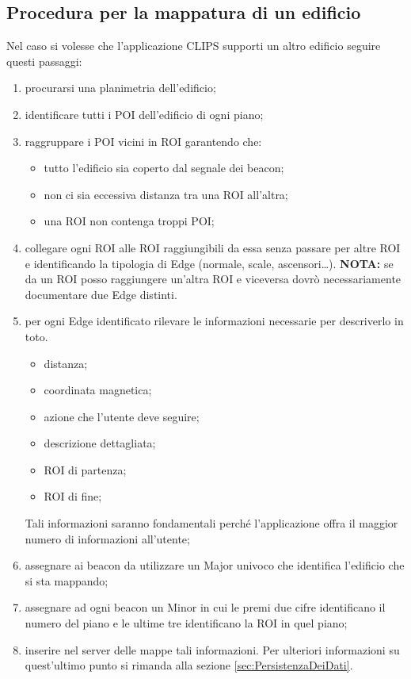 \documentclass[../ManualeSviluppatore.tex]{subfiles}
\begin{document}
	\subsection{Procedura per la mappatura di un edificio}
		Nel caso si volesse che l'applicazione CLIPS supporti un altro edificio seguire questi passaggi:
		\begin{enumerate}
			\item procurarsi una planimetria dell'edificio;
			\item identificare tutti i POI dell'edificio di ogni piano;
			\item raggruppare i POI vicini in ROI garantendo che:
			\begin{itemize}
				\item tutto l'edificio sia coperto dal segnale dei beacon;
				\item non ci sia eccessiva distanza tra una ROI all'altra;
				\item una ROI non contenga troppi POI;
			\end{itemize}
			\item collegare ogni ROI alle ROI raggiungibili da essa senza passare per altre ROI e identificando la tipologia di Edge (normale, scale, ascensori\dots). \textbf{NOTA:} se da un ROI posso raggiungere un'altra ROI e viceversa dovrò necessariamente documentare due Edge distinti.
			\item per ogni Edge identificato rilevare le informazioni necessarie per descriverlo in toto. 
			\begin{itemize}
				\item distanza;
				\item coordinata magnetica;
				\item azione che l'utente deve seguire;
				\item descrizione dettagliata;
				\item ROI di partenza;
				\item ROI di fine;
			\end{itemize}
			Tali informazioni saranno fondamentali perché l'applicazione offra il maggior numero di informazioni all'utente;
			\item assegnare ai \gls{beacon} da utilizzare un Major univoco che identifica l'edificio che si sta mappando;
			\item assegnare ad ogni \gls{beacon} un Minor in cui le premi due cifre identificano il numero del piano e le ultime tre identificano la ROI in quel piano;
			\item inserire nel server delle mappe tali informazioni. Per ulteriori informazioni su quest'ultimo punto si rimanda alla sezione \ref{sec:PersistenzaDeiDati}.
		\end{enumerate}
\end{document}
